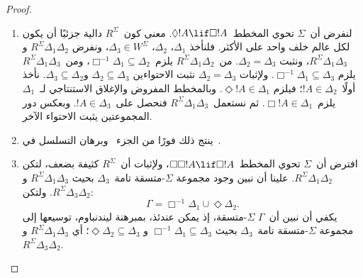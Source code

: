 \documentclass[../../../include/open-logic-section]{subfiles}
\begin{document}
\begin{proof}
  \begin{enumerate}
  \item لنفرض أن~$\Sigma$ تحوي المخطط~$\Diamond !A \lif \Box !A$.
    معنى كون~$R^\Sigma$ دالية جزئيًا أن يكون لكل عالم خلف واحد على الأكثر.
    فلنأخذ $ \Delta_1$، $\Delta_2$، $\Delta_3 \in W^\Sigma$،
    ونفرض $R^\Sigma \Delta_1\Delta_2$ و$R^\Sigma \Delta_1\Delta_3$،
    ونثبت $ \Delta_2 = \Delta_3$.
    من~$R^\Sigma \Delta_1\Delta_2$ يلزم~$\Box^{-1}\Delta_1 \subseteq \Delta_2$،
    ومن~$R^\Sigma \Delta_1\Delta_3$ يلزم
    $\Box^{-1}\Delta_1 \subseteq \Delta_3$.
    ولإثبات $ \Delta_2 = \Delta_3$ نثبت الاحتواءين
    $\Delta_2 \subseteq \Delta_3$ و$\Delta_3 \subseteq \Delta_2$.
    نأخذ أولًا~$!A \in \Delta_2$؛ فيلزم $\Diamond!A \in \Delta_1$.
    وبالمخطط المفروض والإغلاق الاستنتاجي لـ~$\Delta_1$
    يلزم~$\Box!A \in \Delta_1$.
    ثم نستعمل~$R^\Sigma \Delta_1\Delta_3$ فنحصل على~$!A \in \Delta_3$.
    وبعكس دور المجموعتين يثبت الاحتواء الآخر.

  \item ينتج ذلك فورًا من الجزء~ وبرهان
    التسلسل في~.

  \item افترض أن~$\Sigma$ تحوي المخطط~$\Box\Box!A \lif \Box!A$،
    ولإثبات أن~$R^\Sigma$ كثيفة بضعف، لتكن
    $R^\Sigma \Delta_1\Delta_2$. علينا أن نبين وجود مجموعة
    $\Sigma$-متسقة تامة~$\Delta_3$ بحيث
    $R^\Sigma \Delta_1\Delta_3$ و$R^\Sigma \Delta_3\Delta_2$. ولتكن:
    \[
    \Gamma = \Box^{-1}\Delta_1 \cup \Diamond\Delta_2.
    \]
    يكفي أن نبين أن~$\Gamma$ $\Sigma$-متسقة، إذ يمكن عندئذ، بمبرهنة
    ليندنباوم، توسيعها إلى مجموعة $\Sigma$-متسقة تامة~$\Delta_3$ بحيث
    $\Box^{-1}\Delta_1 \subseteq \Delta_3$ و
    $\Diamond\Delta_2 \subseteq \Delta_3$؛ أي
    $R^\Sigma \Delta_1\Delta_3$ و
    $R^\Sigma \Delta_3\Delta_2$.


\end{enumerate}
\end{proof}
\end{document}
